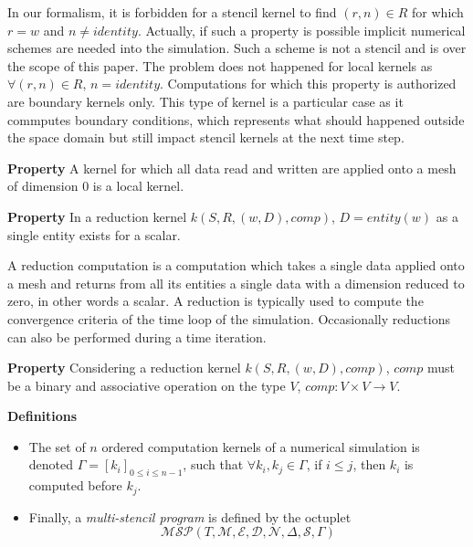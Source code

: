 In our formalism, it is forbidden for a stencil kernel to find $(r,n) \in R$ for which $r=w$ and $n \neq identity$. Actually, if such a property is possible implicit numerical schemes are needed into the simulation. Such a scheme is not a stencil and is over the scope of this paper. The problem does not happened for local kernels as $\forall (r,n) \in R$, $n = identity$. Computations for which this property is authorized are boundary kernels only. This type of kernel is a particular case as it commputes boundary conditions, which represents what should happened outside the space domain but still impact stencil kernels at the next time step.

\noindent \textbf{Property}
A kernel for which all data read and written are applied onto a mesh of dimension $0$ is a local kernel.

\noindent \textbf{Property}
In a reduction kernel $k(S,R,(w,D),comp)$, $D=entity(w)$ as a single entity exists for a scalar.

\medskip
A reduction computation is a computation which takes a single data applied onto a mesh and returns from all its entities a single data with a dimension reduced to zero, in other words a scalar. A reduction is typically used to compute the convergence criteria of the time loop of the simulation. Occasionally reductions can also be performed during a time iteration. %

\medskip
\noindent \textbf{Property}
Considering a reduction kernel $k(S,R,(w,D),comp)$, $comp$ must be a binary and associative operation on the type $V$, $comp: V \times V \rightarrow V$.

\medskip
\noindent \textbf{Definitions}
\begin{itemize}
\item The set of $n$ ordered computation kernels of a numerical simulation is denoted $\Gamma = [k_i]_{0 \leq i \leq n-1}$, such that $\forall k_i,k_j \in \Gamma$, if $i \leq j$, then $k_i$ is computed before $k_j$.
\item Finally, a \textit{multi-stencil program} is defined by the octuplet 
\begin{equation*}
\mathcal{MSP}(T,\mathcal{M},\mathcal{E},\mathcal{D},\mathcal{N},\Delta, \mathcal{S},\Gamma)
\end{equation*}
\end{itemize}

